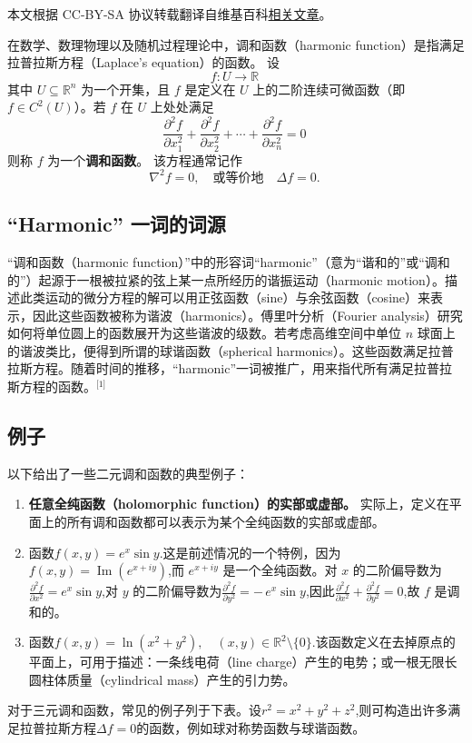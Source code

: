 
本文根据 CC-BY-SA 协议转载翻译自维基百科\href{https://en.wikipedia.org/wiki/Harmonic_function}{相关文章}。


在数学、数理物理以及随机过程理论中，调和函数（harmonic function）是指满足拉普拉斯方程（Laplace's equation）的函数。  
设
\[
f : U \to \mathbb{R}~
\]
其中 \(U \subseteq \mathbb{R}^n\) 为一个开集，且 \(f\) 是定义在 \(U\) 上的二阶连续可微函数（即 \(f \in C^2(U)\)）。若 \(f\) 在 \(U\) 上处处满足
\[
\frac{\partial^2 f}{\partial x_1^2}
+ \frac{\partial^2 f}{\partial x_2^2}
+ \cdots
+ \frac{\partial^2 f}{\partial x_n^2}
= 0~
\]
则称 \(f\) 为一个\textbf{调和函数}。  
该方程通常记作
\[
\nabla^2 f = 0,
\quad \text{或等价地} \quad
\Delta f = 0.~
\]
\subsection{“Harmonic” 一词的词源}
“调和函数（harmonic function）”中的形容词“harmonic”（意为“谐和的”或“调和的”）起源于一根被拉紧的弦上某一点所经历的谐振运动（harmonic motion）。描述此类运动的微分方程的解可以用正弦函数（sine）与余弦函数（cosine）来表示，因此这些函数被称为谐波（harmonics）。傅里叶分析（Fourier analysis）研究如何将单位圆上的函数展开为这些谐波的级数。若考虑高维空间中单位 \(n\) 球面上的谐波类比，便得到所谓的球谐函数（spherical harmonics）。这些函数满足拉普拉斯方程。随着时间的推移，“harmonic”一词被推广，用来指代所有满足拉普拉斯方程的函数。\(^\text{[1]}\)  
\subsection{例子}
以下给出了一些二元调和函数的典型例子：
\begin{enumerate}
  \item \textbf{任意全纯函数（holomorphic function）的实部或虚部。}  
  实际上，定义在平面上的所有调和函数都可以表示为某个全纯函数的实部或虚部。
  \item 函数$f(x, y) = e^{x} \sin y$.这是前述情况的一个特例，因为$f(x, y) = \operatorname{Im}\!\left(e^{x + i y}\right)$,而 \( e^{x + i y} \) 是一个全纯函数。对 \(x\) 的二阶偏导数为$\frac{\partial^2 f}{\partial x^2} = e^{x} \sin y$,对 \(y\) 的二阶偏导数为$\frac{\partial^2 f}{\partial y^2} = -\, e^{x} \sin y$,因此$\frac{\partial^2 f}{\partial x^2} + \frac{\partial^2 f}{\partial y^2} = 0$,故 \(f\) 是调和的。
  \item 函数$f(x, y) = \ln\!\left(x^2 + y^2\right),\quad (x, y) \in \mathbb{R}^2 \setminus \{0\}$.该函数定义在去掉原点的平面上，可用于描述：一条线电荷（line charge）产生的电势；或一根无限长圆柱体质量（cylindrical mass）产生的引力势。
\end{enumerate}
对于三元调和函数，常见的例子列于下表。设$r^2 = x^2 + y^2 + z^2$,则可构造出许多满足拉普拉斯方程$\Delta f = 0$的函数，例如球对称势函数与球谐函数。

